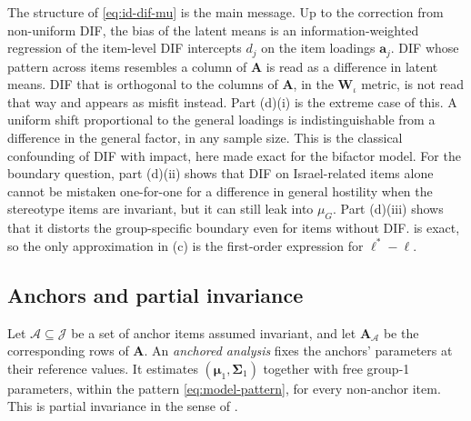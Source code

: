 The structure of \eqref{eq:id-dif-mu} is the main message. Up to the correction from non-uniform DIF, the bias of the latent means is an information-weighted regression of the item-level DIF intercepts $d_j$ on the item loadings $\bm a_j$. DIF whose pattern across items resembles a column of $\bm A$ is read as a difference in latent means. DIF that is orthogonal to the columns of $\bm A$, in the $\bm W_\iota$ metric, is not read that way and appears as misfit instead. Part (d)(i) is the extreme case of this. A uniform shift proportional to the general loadings is indistinguishable from a difference in the general factor, in any sample size. This is the classical confounding of DIF with impact, here made exact for the bifactor model. For the boundary question, part (d)(ii) shows that DIF on Israel-related items alone cannot be mistaken one-for-one for a difference in general hostility when the stereotype items are invariant, but it can still leak into $\mu_G$. Part (d)(iii) shows that it distorts the group-specific boundary even for items without DIF.  is exact, so the only approximation in (c) is the first-order expression for $\bm\ell^*-\bm\ell$.


\subsection{Anchors and partial invariance}\label{sec:id-anchor}

Let $\mathcal A\subseteq\mathcal J$ be a set of anchor items assumed invariant, and let $\bm A_{\mathcal A}$ be the corresponding rows of $\bm A$. An \emph{anchored analysis} fixes the anchors' parameters at their reference values. It estimates $(\bm\mu_1,\bm\Sigma_1)$ together with free group-1 parameters, within the pattern \eqref{eq:model-pattern}, for every non-anchor item. This is partial invariance in the sense of \citet{byrne1989}.

